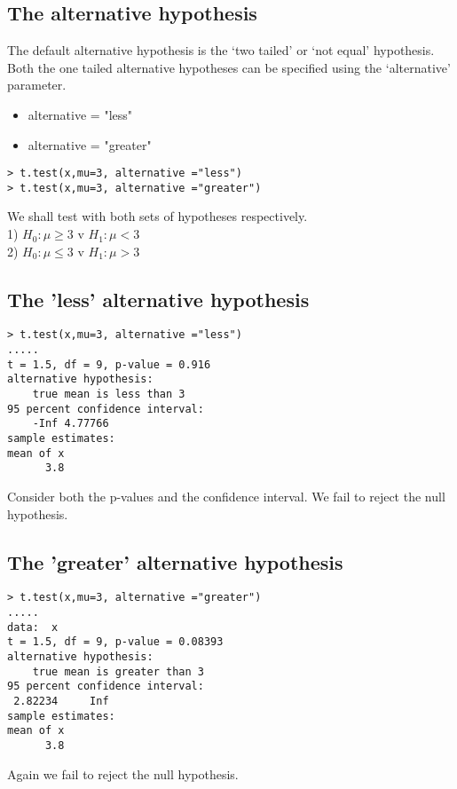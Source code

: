 \documentclass[a4paper,12pt]{article}
\begin{document}
\subsection{The alternative hypothesis}
The default alternative hypothesis is the `two tailed' or `not equal' hypothesis.\\
Both the one tailed alternative hypotheses can be specified using the `alternative' parameter.
\begin{itemize}
\item alternative = "less"
\item alternative = "greater"
\end{itemize}

\begin{verbatim}
> t.test(x,mu=3, alternative ="less")
> t.test(x,mu=3, alternative ="greater")
\end{verbatim}

We shall test with both sets of hypotheses respectively.\\
1) $H_{0}: \mu \geq 3$ \quad v \quad $H_{1}: \mu < 3$\\
2) $H_{0}: \mu \leq 3$ \quad v \quad $H_{1}: \mu > 3$\\
\subsection{The 'less' alternative hypothesis}
\begin{verbatim}
> t.test(x,mu=3, alternative ="less")
.....
t = 1.5, df = 9, p-value = 0.916
alternative hypothesis:
    true mean is less than 3
95 percent confidence interval:
    -Inf 4.77766
sample estimates:
mean of x
      3.8
\end{verbatim}
Consider both the p-values and the confidence interval.
We fail to reject the null hypothesis.
\subsection{ The 'greater' alternative hypothesis}


\begin{verbatim}
> t.test(x,mu=3, alternative ="greater")
.....
data:  x
t = 1.5, df = 9, p-value = 0.08393
alternative hypothesis:
    true mean is greater than 3
95 percent confidence interval:
 2.82234     Inf
sample estimates:
mean of x
      3.8
\end{verbatim}
Again we fail to reject the null hypothesis.
\end{document}
